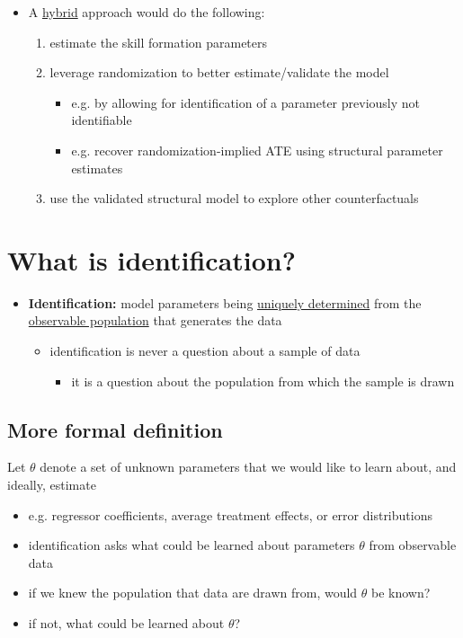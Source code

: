 \documentclass[11pt]{article}
\begin{document}
\begin{itemize}
\item A \uline{hybrid} approach would do the following:

\begin{enumerate}
\item estimate the skill formation parameters
\item leverage randomization to better estimate/validate the model
\begin{itemize}
\item e.g. by allowing for identification of a parameter previously not identifiable
\item e.g. recover randomization-implied ATE using structural parameter estimates
\end{itemize}
\item use the validated structural model to explore other counterfactuals
\end{enumerate}
\end{itemize}

\section{What is identification? \cite{lewbel2019zoo}}
\label{sec:orgfc1ae97}

\begin{itemize}
\item \textbf{Identification:} model parameters being \uline{uniquely determined} from the \uline{observable population} that generates the data
\begin{itemize}
\item identification is never a question about a sample of data
\begin{itemize}
\item it is a question about the population from which the sample is drawn
\end{itemize}
\end{itemize}
\end{itemize}

\subsection{More formal definition}
\label{sec:org1dc3ca0}


Let \(\theta\) denote a set of unknown parameters that we would like to learn about, and ideally, estimate

\begin{itemize}
\item e.g. regressor coefficients, average treatment effects, or error distributions
\item identification asks what could be learned about parameters \(\theta\) from observable data
\item if we knew the population that data are drawn from, would \(\theta\) be known?
\item if not, what could be learned about \(\theta\)?
\end{itemize}
\end{document}
